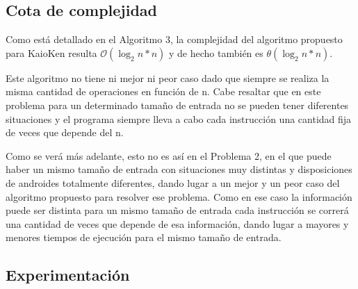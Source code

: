 \newpage
\subsection{Cota de complejidad}
\par{Como está detallado en el Algoritmo 3, la complejidad del algoritmo propuesto para KaioKen resulta $\mathcal{O}(\log _{2} n * n)$ y de hecho también es $\mathcal{\theta}(\log _{2} n * n)$}.
\par{Este algoritmo no tiene ni mejor ni peor caso dado que siempre se realiza la misma cantidad de operaciones en función de n. Cabe resaltar que en este problema para un determinado tamaño de entrada no se pueden tener diferentes situaciones y el programa siempre lleva a cabo cada instrucción una cantidad fija de veces que depende del n.}
\par{Como se verá más adelante, esto no es así en el Problema 2, en el que puede haber un mismo tamaño de entrada con situaciones muy distintas y disposiciones de androides totalmente diferentes, dando lugar a un mejor y un peor caso del algoritmo propuesto para resolver ese problema. Como en ese caso la información puede ser distinta para un mismo tamaño de entrada cada instrucción se correrá una cantidad de veces que depende de esa información, dando lugar a mayores y menores tiempos de ejecución para el mismo tamaño de entrada.}


\subsection{Experimentación}

